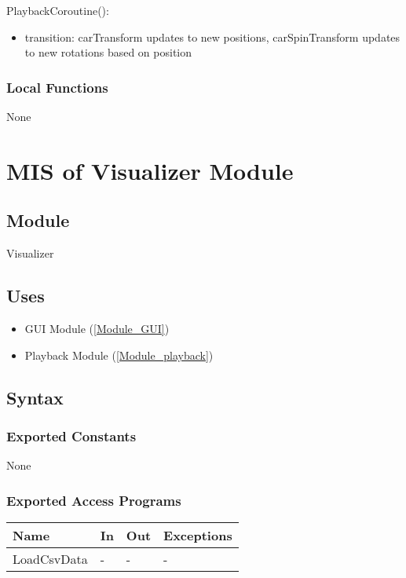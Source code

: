 \documentclass[12pt, titlepage]{article}
\begin{document}
\noindent PlaybackCoroutine():
\begin{itemize}
\item transition: carTransform updates to new positions, carSpinTransform updates to new rotations based on position
\end{itemize}

\subsubsection{Local Functions}

None

\newpage

\section{MIS of Visualizer Module} \label{Module_visualizer} 

\subsection{Module}

Visualizer

\subsection{Uses}

\begin{itemize}
  \item GUI Module (\ref{Module_GUI})
  \item Playback Module (\ref{Module_playback})
\end{itemize}

\subsection{Syntax}

\subsubsection{Exported Constants}
None

\subsubsection{Exported Access Programs}

\begin{center}
\begin{tabular}{p{2cm} p{4cm} p{4cm} p{2cm}}
\hline
\textbf{Name} & \textbf{In} & \textbf{Out} & \textbf{Exceptions} \\
\hline
LoadCsvData & - & - & - \\
\hline
\end{tabular}
\end{center}
\end{document}
